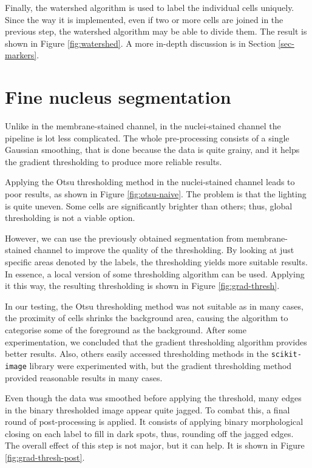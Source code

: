 \documentclass[
  digital,     %
  oneside,     %
  nosansbold,  %
  nocolorbold, %
  lof,         %
  lot,         %
]{fithesis4}
\begin{document}
Finally, the watershed algorithm is used to label the individual cells uniquely.
Since the way it is implemented, even if two or more cells are joined in the
previous step, the watershed algorithm may be able to divide them. The result
is shown in Figure \ref{fig:watershed}. A more in-depth discussion is in Section
\ref{sec-markers}.

\section{Fine nucleus segmentation}
Unlike in the membrane-stained channel, in the nuclei-stained channel the
pipeline is lot less complicated. The whole pre-processing consists of a single
Gaussian smoothing, that is done because the data is quite grainy, and it helps
the gradient thresholding to produce more reliable results.

Applying the Otsu thresholding method in the nuclei-stained channel leads to
poor results, as shown in Figure \ref{fig:otsu-naive}. The problem is that the
lighting is quite uneven. Some cells are significantly brighter than others;
thus, global thresholding is not a viable option.

However, we can use the previously obtained segmentation from membrane-stained
channel to improve the quality of the thresholding. By looking at just specific
areas denoted by the labels, the thresholding yields more suitable results. In
essence, a local version of some thresholding algorithm can be used. Applying it
this way, the resulting thresholding is shown in Figure \ref{fig:grad-thresh}.

In our testing, the Otsu thresholding method was not suitable as in many cases, the
proximity of cells shrinks the background area, causing the algorithm to
categorise some of the foreground as the background. After some experimentation,
we concluded that the gradient thresholding algorithm provides better results.
Also, others easily accessed thresholding methods in the \texttt{scikit-image}
library were experimented with, but the gradient thresholding method provided
reasonable results in many cases.

Even though the data was smoothed before applying the threshold, many edges in
the binary thresholded image appear quite jagged. To combat this, a final round
of post-processing is applied. It consists of applying binary morphological
closing on each label to fill in dark spots, thus, rounding off the jagged edges.
The overall effect of this step is not major, but it can help. It is shown in
Figure \ref{fig:grad-thresh-post}.
\end{document}
